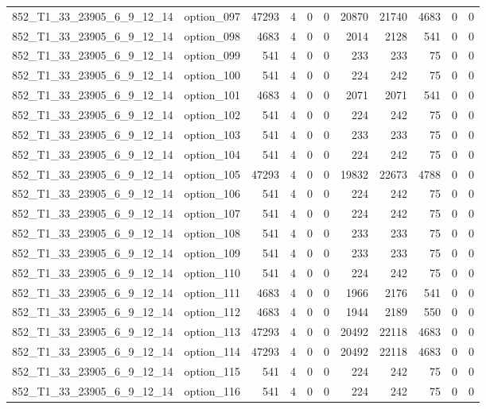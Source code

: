 \begin{tabular}{llrrrrrrrrr}
852\_T1\_33\_23905\_6\_9\_12\_14 & option\_097 & 47293 & 4 & 0 & 0 & 20870 & 21740 & 4683 & 0 & 0 \\
852\_T1\_33\_23905\_6\_9\_12\_14 & option\_098 & 4683 & 4 & 0 & 0 & 2014 & 2128 & 541 & 0 & 0 \\
852\_T1\_33\_23905\_6\_9\_12\_14 & option\_099 & 541 & 4 & 0 & 0 & 233 & 233 & 75 & 0 & 0 \\
852\_T1\_33\_23905\_6\_9\_12\_14 & option\_100 & 541 & 4 & 0 & 0 & 224 & 242 & 75 & 0 & 0 \\
852\_T1\_33\_23905\_6\_9\_12\_14 & option\_101 & 4683 & 4 & 0 & 0 & 2071 & 2071 & 541 & 0 & 0 \\
852\_T1\_33\_23905\_6\_9\_12\_14 & option\_102 & 541 & 4 & 0 & 0 & 224 & 242 & 75 & 0 & 0 \\
852\_T1\_33\_23905\_6\_9\_12\_14 & option\_103 & 541 & 4 & 0 & 0 & 233 & 233 & 75 & 0 & 0 \\
852\_T1\_33\_23905\_6\_9\_12\_14 & option\_104 & 541 & 4 & 0 & 0 & 224 & 242 & 75 & 0 & 0 \\
852\_T1\_33\_23905\_6\_9\_12\_14 & option\_105 & 47293 & 4 & 0 & 0 & 19832 & 22673 & 4788 & 0 & 0 \\
852\_T1\_33\_23905\_6\_9\_12\_14 & option\_106 & 541 & 4 & 0 & 0 & 224 & 242 & 75 & 0 & 0 \\
852\_T1\_33\_23905\_6\_9\_12\_14 & option\_107 & 541 & 4 & 0 & 0 & 224 & 242 & 75 & 0 & 0 \\
852\_T1\_33\_23905\_6\_9\_12\_14 & option\_108 & 541 & 4 & 0 & 0 & 233 & 233 & 75 & 0 & 0 \\
852\_T1\_33\_23905\_6\_9\_12\_14 & option\_109 & 541 & 4 & 0 & 0 & 233 & 233 & 75 & 0 & 0 \\
852\_T1\_33\_23905\_6\_9\_12\_14 & option\_110 & 541 & 4 & 0 & 0 & 224 & 242 & 75 & 0 & 0 \\
852\_T1\_33\_23905\_6\_9\_12\_14 & option\_111 & 4683 & 4 & 0 & 0 & 1966 & 2176 & 541 & 0 & 0 \\
852\_T1\_33\_23905\_6\_9\_12\_14 & option\_112 & 4683 & 4 & 0 & 0 & 1944 & 2189 & 550 & 0 & 0 \\
852\_T1\_33\_23905\_6\_9\_12\_14 & option\_113 & 47293 & 4 & 0 & 0 & 20492 & 22118 & 4683 & 0 & 0 \\
852\_T1\_33\_23905\_6\_9\_12\_14 & option\_114 & 47293 & 4 & 0 & 0 & 20492 & 22118 & 4683 & 0 & 0 \\
852\_T1\_33\_23905\_6\_9\_12\_14 & option\_115 & 541 & 4 & 0 & 0 & 224 & 242 & 75 & 0 & 0 \\
852\_T1\_33\_23905\_6\_9\_12\_14 & option\_116 & 541 & 4 & 0 & 0 & 224 & 242 & 75 & 0 & 0 \\

\end{tabular}
